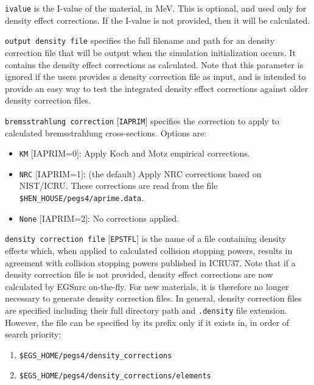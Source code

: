 \begin{description}
\begin{description}
\item {\tt ivalue} is the I-value of the material, in MeV. This is optional, and used only for density effect corrections. If the I-value is not provided, then it will be calculated.
\item {\tt output density file} specifies the full filename and path for an density correction file that will be output when the simulation initialization occurs. It contains the density effect corrections as calculated. Note that this parameter is ignored if the users provides a density correction file as input, and is intended to provide an easy way to test the integrated density effect corrections against older density correction files.
\item {\tt bremsstrahlung correction} $[${\tt IAPRIM}$]$ specifies the
correction to apply to calculated bremsstrahlung cross-sections.
Options are:
\begin{itemize}
\item {\tt KM} $[$IAPRIM=0$]$: Apply Koch and Motz\cite{KM59} empirical corrections.
\item {\tt NRC} $[$IAPRIM=1$]$: (the default) Apply NRC corrections based on NIST/ICRU\cite{Ro89a}.  These corrections are read from the file
{\tt \$HEN\_HOUSE/pegs4/aprime.data}.
\item {\tt None} $[$IAPRIM=2$]$: No corrections applied.
\end{itemize}
\item {\tt density correction file} $[${\tt EPSTFL}$]$ is the name of a file containing density effects which, when applied to calculated collision
stopping powers, results in agreement with collision stopping powers published in ICRU37\cite{ICRU37}.
Note that if a density correction file is not provided, density effect corrections are now calculated by EGSnrc on-the-fly. For new materials, it is therefore no longer necessary to generate density correction files.
In general, density correction files are specified including their full directory path and {\tt .density} file extension.  However,
the file can be specified by its prefix only if it
exists in, in order of search priority:
\begin{enumerate}
\item {\tt \$EGS\_HOME/pegs4/density\_corrections}
\item {\tt \$EGS\_HOME/pegs4/density\_corrections/elements}

\end{enumerate}
\end{description}
\end{description}
